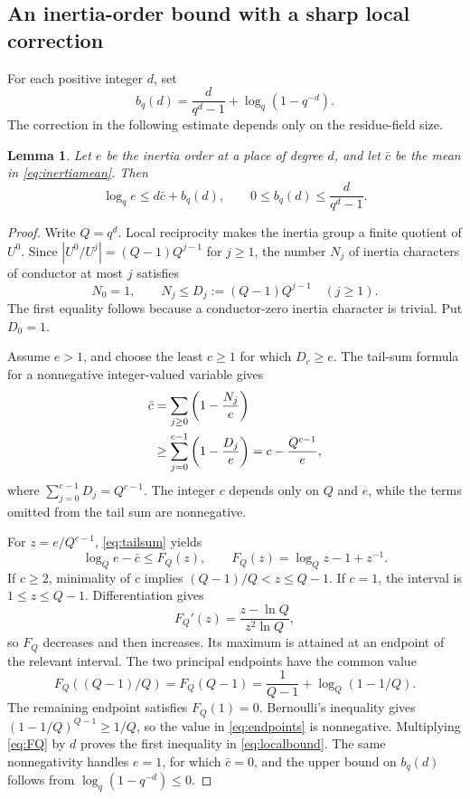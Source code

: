 \documentclass[12pt,onecolumn,draftclsnofoot,letterpaper]{IEEEtran}
\newtheorem{lemma}{Lemma}
\theoremstyle{remark}
\begin{document}
\subsection{An inertia-order bound with a sharp local correction}
For each positive integer $d$, set
\begin{equation}
 b_q(d)=\frac{d}{q^d-1}+\log_q(1-q^{-d}).
 \label{eq:bq}
\end{equation}
The correction in the following estimate depends only on the residue-field size.
\begin{lemma}\label{lem:localbound}
Let $e$ be the inertia order at a place of degree $d$, and let $\bar c$ be the mean in \eqref{eq:inertiamean}. Then
\begin{equation}
 \log_qe\le d\bar c+b_q(d),\qquad
 0\le b_q(d)\le\frac{d}{q^d-1}.
 \label{eq:localbound}
\end{equation}
\end{lemma}
\begin{proof}
Write $Q=q^d$. Local reciprocity makes the inertia group a finite quotient of $U^0$. Since $|U^0/U^j|=(Q-1)Q^{j-1}$ for $j\ge1$, the number $N_j$ of inertia characters of conductor at most $j$ satisfies
\begin{equation}
 N_0=1,\qquad N_j\le D_j:=(Q-1)Q^{j-1}\quad(j\ge1).
 \label{eq:countlevels}
\end{equation}
The first equality follows because a conductor-zero inertia character is trivial. Put $D_0=1$.

Assume $e>1$, and choose the least $c\ge1$ for which $D_c\ge e$. The tail-sum formula for a nonnegative integer-valued variable gives
\begin{align}
 \bar c
 &=\sum_{j\ge0}\left(1-\frac{N_j}{e}\right)\notag\\
 &\ge\sum_{j=0}^{c-1}\left(1-\frac{D_j}{e}\right)
 =c-\frac{Q^{c-1}}e,
 \label{eq:tailsum}
\end{align}
where $\sum_{j=0}^{c-1}D_j=Q^{c-1}$. The integer $c$ depends only on $Q$ and $e$, while the terms omitted from the tail sum are nonnegative.

For $z=e/Q^{c-1}$, \eqref{eq:tailsum} yields
\begin{equation}
 \log_Qe-\bar c\le F_Q(z),\qquad
 F_Q(z)=\log_Qz-1+z^{-1}.
 \label{eq:FQ}
\end{equation}
If $c\ge2$, minimality of $c$ implies $(Q-1)/Q<z\le Q-1$. If $c=1$, the interval is $1\le z\le Q-1$. Differentiation gives
\[
 F_Q'(z)=\frac{z-\ln Q}{z^2\ln Q},
\]
so $F_Q$ decreases and then increases. Its maximum is attained at an endpoint of the relevant interval. The two principal endpoints have the common value
\begin{equation}
 F_Q((Q-1)/Q)=F_Q(Q-1)
 =\frac1{Q-1}+\log_Q(1-1/Q).
 \label{eq:endpoints}
\end{equation}
The remaining endpoint satisfies $F_Q(1)=0$. Bernoulli's inequality gives
$(1-1/Q)^{Q-1}\ge1/Q$, so the value in \eqref{eq:endpoints} is nonnegative. Multiplying \eqref{eq:FQ} by $d$ proves the first inequality in \eqref{eq:localbound}. The same nonnegativity handles $e=1$, for which $\bar c=0$, and the upper bound on $b_q(d)$ follows from $\log_q(1-q^{-d})\le0$.
\end{proof}
\end{document}
